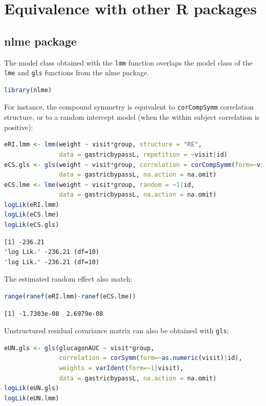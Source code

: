 \documentclass[12pt]{article}
\begin{document}
\clearpage
\section{Equivalence with other R packages}
\label{sec:orgb95222e}

\subsection{nlme package}
\label{sec:org19b12b5}

The model class obtained with the \texttt{lmm} function overlaps the model
class of the \texttt{lme} and \texttt{gls} functions from the nlme package.
\begin{lstlisting}[language=r,numbers=none]
library(nlme)
\end{lstlisting}

For instance, the compound symmetry is equivalent to \texttt{corCompSymm}
correlation structure, or to a random intercept model (when the within
subject correlation is positive):
\begin{lstlisting}[language=r,numbers=none]
eRI.lmm <- lmm(weight ~ visit*group, structure = "RE",
               data = gastricbypassL, repetition = ~visit|id)
eCS.gls <- gls(weight ~ visit*group, correlation = corCompSymm(form=~visit|id),
               data = gastricbypassL, na.action = na.omit)
eCS.lme <- lme(weight ~ visit*group, random = ~1|id,
               data = gastricbypassL, na.action = na.omit)
logLik(eRI.lmm)
logLik(eCS.lme)
logLik(eCS.gls)
\end{lstlisting}

\label{}
\begin{verbatim}
[1] -236.21
'log Lik.' -236.21 (df=10)
'log Lik.' -236.21 (df=10)
\end{verbatim}


The estimated random effect also match:
\begin{lstlisting}[language=r,numbers=none]
range(ranef(eRI.lmm)-ranef(eCS.lme))
\end{lstlisting}

\label{}
\begin{verbatim}
[1] -1.7303e-08  2.6979e-08
\end{verbatim}


Unstructured residual covariance matrix can also be obtained with
\texttt{gls}:
\begin{lstlisting}[language=r,numbers=none]
eUN.gls <- gls(glucagonAUC ~ visit*group,
               correlation = corSymm(form=~as.numeric(visit)|id),
               weights = varIdent(form=~1|visit),
               data = gastricbypassL, na.action = na.omit)
logLik(eUN.gls)
logLik(eUN.lmm)
\end{lstlisting}
\end{document}
